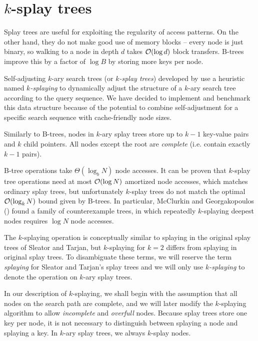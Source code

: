 \chapter{$k$-splay trees}
\label{chapter:ksplay}
Splay trees are useful for exploiting the regularity of access patterns.
On the other hand, they do not make good use of memory blocks -- every node
is just binary, so walking to a node in depth $d$ takes $\mathcal{O}(\log d)$ block
transfers. B-trees improve this by a factor of $\log B$ by storing more keys
per node.

Self-adjusting $k$-ary search trees (or \emph{$k$-splay trees}) developed
by \cite{ksplay-sherk} use a heuristic named \emph{$k$-splaying}
to dynamically adjust the structure of a $k$-ary search tree according to
the query sequence. We have decided to implement and benchmark this data
structure because of the potential to combine self-adjustment for a specific
search sequence with cache-friendly node sizes.

Similarly to B-trees, nodes in $k$-ary splay trees store up to $k-1$ key-value
pairs and $k$ child pointers. All nodes except the root are \emph{complete}
(i.e. contain exactly $k-1$ pairs).

B-tree operations take $\Theta(\log_b N)$ node accesses. It can be proven that
$k$-splay tree operations need at most $\mathcal{O}(\log N)$ amortized node accesses,
which matches ordinary splay trees, but unfortunately $k$-splay trees
do not match the optimal $\mathcal{O}(\log_k N)$ bound given by B-trees. In particular,
McClurkin and Georgakopoulos (\citeyear{ksplay-nonopt}) found a family
of counterexample trees, in which repeatedly $k$-splaying deepest nodes
requires $\log N$ node accesses.

The $k$-splaying operation is conceptually similar to splaying in the original
splay trees of Sleator and Tarjan, but $k$-splaying for $k=2$ differs from
splaying in original splay trees. To disambiguate these terms, we will
reserve the term \emph{splaying} for Sleator and Tarjan's splay trees and
we will only use \emph{$k$-splaying} to denote the operation
on $k$-ary splay trees.

In our description of $k$-splaying, we shall begin with the assumption that
all nodes on the search path are complete, and we will later modify
the $k$-splaying algorithm to allow \emph{incomplete} and \emph{overfull}
nodes.
Because splay trees store one key per node, it is not necessary to distinguish
between splaying a node and splaying a key. In $k$-ary splay trees, we always
$k$-splay nodes.

